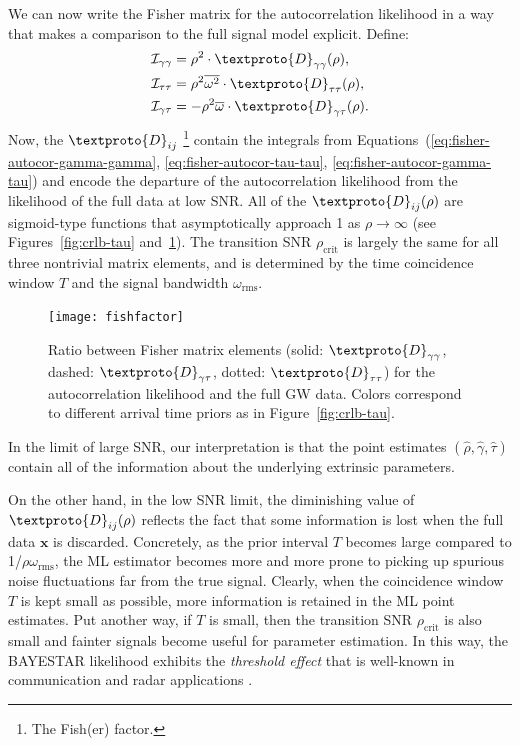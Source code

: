 \documentclass[amsmath,amssymb,aps,prx,reprint,nopreprintnumbers,nofootinbib,showpacs]{revtex4-1}
\begin{document}
We can now write the Fisher matrix for the autocorrelation likelihood in a way that makes a comparison to the full signal model explicit. Define:
%
\begin{align*}
    \mathcal{I}_{\gamma\gamma} &= \rho^2 \cdot \textproto{D}_{\gamma\gamma}(\rho), \\
    \mathcal{I}_{\tau\tau} &= \rho^2 \overline{\omega^2} \cdot \textproto{D}_{\tau\tau}(\rho), \\
    \mathcal{I}_{\gamma\tau} &= -\rho^2 \overline{\omega} \cdot \textproto{D}_{\gamma\tau}(\rho).
\end{align*}
%
Now, the $\textproto{D}_{ij}$%
%
\footnote{The Fish(er) factor.}
%
contain the integrals from Equations~(\ref{eq:fisher-autocor-gamma-gamma}, \ref{eq:fisher-autocor-tau-tau}, \ref{eq:fisher-autocor-gamma-tau}) and encode the departure of the autocorrelation likelihood from the likelihood of the full data at low \ac{SNR}. All of the $\textproto{D}_{ij}(\rho)$ are sigmoid-type functions that asymptotically approach 1 as $\rho \rightarrow \infty$ (see Figures~\ref{fig:crlb-tau} and~\ref{fig:fishfactor}). The transition \ac{SNR} $\rho_\mathrm{crit}$ is largely the same for all three nontrivial matrix elements, and is determined by the time coincidence window $T$ and the signal bandwidth $\omega_\mathrm{rms}$.

\begin{figure}
    \centering
    \texttt{[image: fishfactor]}
    \caption[Ratio of Fisher matrix elements between autocorrelation likelihood and full \acs{GW} data]{\label{fig:fishfactor}Ratio between Fisher matrix elements (solid: $\textproto{D}_{\gamma\gamma}$, dashed: $\textproto{D}_{\gamma\tau}$, dotted: $\textproto{D}_{\tau\tau}$) for the autocorrelation likelihood and the full \ac{GW} data. Colors correspond to different arrival time priors as in Figure~\ref{fig:crlb-tau}.}
\end{figure}

In the limit of large \ac{SNR}, our interpretation is that the point estimates $(\hat\rho, \hat\gamma, \hat\tau)$ contain all of the information about the underlying extrinsic parameters.

On the other hand, in the low \ac{SNR} limit, the diminishing value of $\textproto{D}_{ij}(\rho)$ reflects the fact that some information is lost when the full data $\mathbf{x}$ is discarded. Concretely, as the prior interval $T$ becomes large compared to 1/$\rho\omega_\mathrm{rms}$, the \ac{ML} estimator becomes more and more prone to picking up spurious noise fluctuations far from the true signal. Clearly, when the coincidence window $T$ is kept small as possible, more information is retained in the \ac{ML} point estimates. Put another way, if $T$ is small, then the transition \ac{SNR} $\rho_\mathrm{crit}$ is also small and fainter signals become useful for parameter estimation. In this way, the \ac{BAYESTAR} likelihood exhibits the \emph{threshold effect} that is well\nobreakdashes-known in communication and radar applications \citep{barankin1949locally,mcaulay1969barankin,mcaulay1971barankin}.
\end{document}

